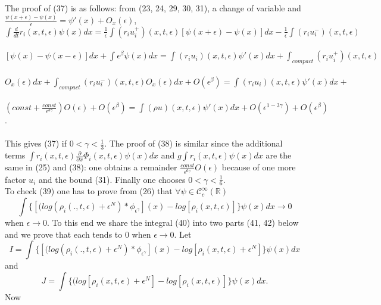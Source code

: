 \documentclass[a4paper,12pt]{article}
\begin{document}
  The proof of (37) is as follows: from (23, 24, 29, 30, 31), a change of variable and $\frac{\psi(x+\epsilon)-\psi(x)}{\epsilon}=\psi'(x)+O_x(\epsilon)$,\\
     
  $ \int \frac{d}{dt}r_i(x,t,\epsilon)\psi(x)dx=
  \frac{1}{\epsilon}\int (r_i u_i^+)(x,t,\epsilon)[\psi(x+\epsilon)-\psi(x)]dx -\frac{1}{\epsilon}\int (r_i u_i^-)(x,t,\epsilon)$\\
\\
$[\psi(x)-\psi(x-\epsilon)]dx+  
\int\epsilon^\beta \psi(x)dx =
  \int (r_i u_i)(x,t,\epsilon)\psi'(x)dx+\int_{compact} (r_i u_i^+)(x,t,\epsilon)$ \\
\\
$O_x(\epsilon)dx+ 
\int_{compact} (r_i u_i^-)(x,t,\epsilon) O_x(\epsilon)dx+O(\epsilon^\beta)= \int(r_iu_i)(x,t,\epsilon)\psi'(x) dx+$\\
\\
$(const+\frac{const}{\epsilon^{3\gamma}}) O(\epsilon)+O(\epsilon^\beta)= \int(\rho u)(x,t,\epsilon)\psi'(x) dx+O(\epsilon^{1-3\gamma})+O(\epsilon^\beta)$.\\
  \\
   This gives (37) if $0<\gamma<\frac{1}{3}$. The proof of (38) is similar since the additional terms $\int r_i(x,t,\epsilon)\frac{\partial}{\partial x}\Phi_i(x,t,\epsilon)\psi(x)dx$ and $g\int r_i(x,t,\epsilon)\psi(x) dx$ are the same in (25) and (38): one obtains a remainder $\frac{const}{\epsilon^{6\gamma}}  O(\epsilon)$ because of one more factor $u_i$ and the bound (31). Finally one chooses $0<\gamma<\frac{1}{6}$.\\
  
   
 
 
 To check (39) one has to prove from (26) that $\forall \psi \in \mathcal{C}_c^\infty(\mathbb{R})$
  \begin{equation}\int\{[(log(\rho_i(.,t,\epsilon)+\epsilon^N)*\phi_{\epsilon^\gamma}](x)-log[\rho_i(x,t,\epsilon)]\}\psi(x)dx \rightarrow 0   \end{equation}
  when $\epsilon\rightarrow 0$. To this end we share the integral (40) into two parts (41, 42) below and we prove that each  tends to 0 when $\epsilon\rightarrow 0$. Let 
   \begin{equation}I=  \int\{[(log(\rho_i(.,t,\epsilon)+\epsilon^N)*\phi_{\epsilon^\gamma}](x)-log[\rho_i(x,t,\epsilon)+\epsilon^N]\}\psi(x)dx \end{equation} 
  and 
  \begin{equation} J=\int\{(log[\rho_i(x,t,\epsilon)+\epsilon^N]-log[\rho_i(x,t,\epsilon)]\}\psi(x)dx.\end{equation}
  Now\\
\end{document}
